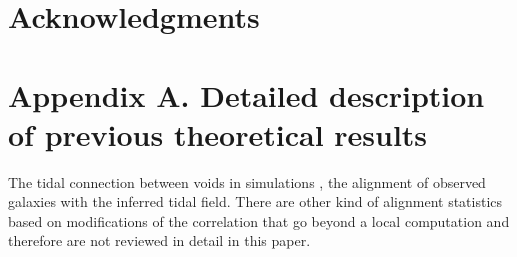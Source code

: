 \documentclass[useAMS,usenatbib]{mn2e}
\begin{document}
\section*{Acknowledgments} 

\section*{Appendix A. Detailed description of previous theoretical results}


The tidal connection between voids in simulations \citep{Platen2008},
the alignment of observed galaxies with the inferred tidal
field\citep{Lee2007,Jones2010}. There are other kind of alignment
statistics based on modifications of the correlation
\citep{Paz2008,Faltenbacher2009} that go beyond a local computation
and therefore are not reviewed in detail in this paper.
\end{document}
